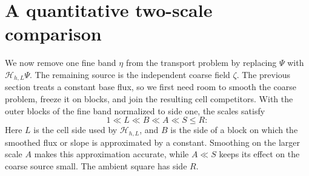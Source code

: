 \documentclass{aomart}
\theoremstyle{definition}
\newcommand{\1}{\mathbf 1}
\begin{document}
\section{A quantitative two-scale comparison}\label{sec:two-scale}

We now remove one fine band $\eta$ from the transport problem by
replacing $\Psi$ with $\mathcal H_{h,L}\Psi$.  The remaining source is
the independent coarse field $\zeta$.  The previous section treats a
constant base flux, so we first need room to smooth the coarse problem,
freeze it on blocks, and join the resulting cell competitors.
With the outer blocks of the fine band normalized to side one, the
scales satisfy
\[
1\ll L\ll B\ll A\ll S\leq R:
\]
Here $L$ is the cell side used by $\mathcal H_{h,L}$, and $B$ is the
side of a block on which the smoothed flux or slope is approximated by a
constant.  Smoothing on the larger scale $A$ makes this approximation
accurate, while $A\ll S$ keeps its effect on the coarse source small.
The ambient square has side $R$.
\end{document}
